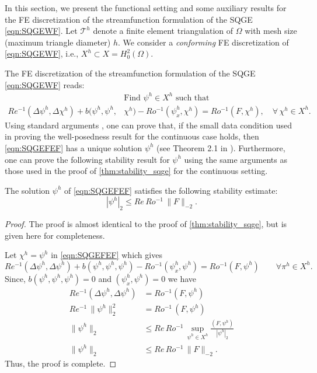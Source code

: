 In this section, we present the functional setting and some auxiliary results
for the FE discretization of the streamfunction formulation of the SQGE
\eqref{eqn:SQGEWF}. Let $\mathcal{T}^h$ denote a finite element triangulation of
$\Omega$ with mesh size (maximum triangle diameter) $h$. We consider a
\emph{conforming} FE discretization of \eqref{eqn:SQGEWF}, i.e., $X^h \subset X
= H_0^2(\Omega)$.

The FE discretization of the streamfunction formulation of the SQGE
\eqref{eqn:SQGEWF} reads:
\begin{equation}
  \begin{split}
    &\text{Find } \psi^h \in X^h \text{ such that} \\
    Re^{-1}(\Delta \psi^h, \Delta \chi^h)
      + b(\psi^h,\psi^h,&\chi^h)
      - Ro^{-1} (\psi_x^h,\chi^h)
      = Ro^{-1}(F,\chi^h),\quad \forall \, \chi^h \in X^h.
    \label{eqn:SQGEFEF}
  \end{split}
\end{equation}
Using standard arguments \cite{Girault79,Girault86}, one can prove that, if the
small data condition used in proving the well-posedness result for the
continuous case holds, then \eqref{eqn:SQGEFEF} has a unique solution $\psi^h$
(see Theorem 2.1 in \cite{Cayco86}). Furthermore, one can prove the following
stability result for $\psi^h$ using the same arguments as those used in the
proof of \eqref{thm:stability_sqge} for the continuous setting.
\begin{thm} \label{thm:stability_fem_sqge} The
  solution $\psi^h$ of \eqref{eqn:SQGEFEF} satisfies the following stability estimate:
 \begin{equation}
   |\psi^h|_2 \le Re \, Ro^{-1} \, \| F \|_{-2} .
   \label{eqn:stability_fem_sqge}
 \end{equation}
\end{thm}
\begin{proof}
  The proof is almost identical to the proof of \autoref{thm:stability_sqge},
  but is given here for completeness.

  Let $\chi^h = \psi^h$ in \eqref{eqn:SQGEFEF} which gives
  \begin{equation*}
    Re^{-1}(\Delta \psi^h, \Delta \psi^h)
      + b(\psi^h,\psi^h,\psi^h)
      - Ro^{-1} (\psi_x^h,\psi^h)
      = Ro^{-1} (F,\psi^h)\qquad  \forall \pi^h \in X^h.
  \end{equation*}
  Since, $b(\psi^h, \psi^h, \psi^h) =0$ and $(\psi_x^h,\psi^h)=0$ we have
  \begin{align*}
    Re^{-1}(\Delta \psi^h, \Delta \psi^h) &= Ro^{-1} (F,\psi^h) \\
    Re^{-1}\, \|\psi^h\|_2^2 &= Ro^{-1}\, (F,\psi^h) \\
    \|\psi^h\|_2 &\le Re\, Ro^{-1}\,\sup_{\psi^h \in X^h} \frac{(F,\psi^h)}{|\psi^h|_2} \\
    \|\psi^h\|_2 &\le Re\, Ro^{-1}\, \|F\|_{-2}.
  \end{align*}
  Thus, the proof is complete.
\end{proof}

